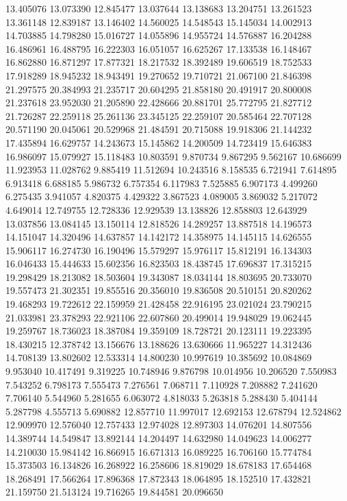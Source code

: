 13.405076
13.073390
12.845477
13.037644
13.138683
13.204751
13.261523
13.361148
12.839187
13.146402
14.560025
14.548543
15.145034
14.002913
14.703885
14.798280
15.016727
14.055896
14.955724
14.576887
16.204288
16.486961
16.488795
16.222303
16.051057
16.625267
17.133538
16.148467
16.862880
16.871297
17.877321
18.217532
18.392489
19.606519
18.752533
17.918289
18.945232
18.943491
19.270652
19.710721
21.067100
21.846398
21.297575
20.384993
21.235717
20.604295
21.858180
20.491917
20.800008
21.237618
23.952030
21.205890
22.428666
20.881701
25.772795
21.827712
21.726287
22.259118
25.261136
23.345125
22.259107
20.585464
22.707128
20.571190
20.045061
20.529968
21.484591
20.715088
19.918306
21.144232
17.435894
16.629757
14.243673
15.145862
14.200509
14.723419
15.646383
16.986097
15.079927
15.118483
10.803591
9.870734
9.867295
9.562167
10.686699
11.923953
11.028762
9.885419
11.512694
10.243516
8.158535
6.721941
7.614895
6.913418
6.688185
5.986732
6.757354
6.117983
7.525885
6.907173
4.499260
6.275435
3.941057
4.820375
4.429322
3.867523
4.089005
3.869032
5.217072
4.649014
12.749755
12.728336
12.929539
13.138826
12.858803
12.643929
13.037856
13.084145
13.150114
12.818526
14.289257
13.887518
14.196573
14.151047
14.320496
14.637857
14.142172
14.358975
14.145115
14.626555
15.906117
16.274730
16.190496
15.579297
15.976117
15.812191
16.134303
16.046433
15.444633
15.602356
16.823503
18.438745
17.696837
17.315215
19.298429
18.213082
18.503604
19.343087
18.034144
18.803695
20.733070
19.557473
21.302351
19.855516
20.356010
19.836508
20.510151
20.820262
19.468293
19.722612
22.159959
21.428458
22.916195
23.021024
23.790215
21.033981
23.378293
22.921106
22.607860
20.499014
19.948029
19.062445
19.259767
18.736023
18.387084
19.359109
18.728721
20.123111
19.223395
18.430215
12.378742
13.156676
13.188626
13.630666
11.965227
14.312436
14.708139
13.802602
12.533314
14.800230
10.997619
10.385692
10.084869
9.953040
10.417491
9.319225
10.748946
9.876798
10.014956
10.206520
7.550983
7.543252
6.798173
7.555473
7.276561
7.068711
7.110928
7.208882
7.241620
7.706140
5.544960
5.281655
6.063072
4.818033
5.263818
5.288430
5.404144
5.287798
4.555713
5.690882
12.857710
11.997017
12.692153
12.678794
12.524862
12.909970
12.576040
12.757433
12.974028
12.897303
14.076201
14.807556
14.389744
14.549847
13.892144
14.204497
14.632980
14.049623
14.006277
14.210030
15.984142
16.866915
16.671313
16.089225
16.706160
15.774784
15.373503
16.134826
16.268922
16.258606
18.819029
18.678183
17.654468
18.268491
17.566264
17.896368
17.872343
18.064895
18.152510
17.432821
21.159750
21.513124
19.716265
19.844581
20.096650
